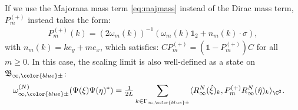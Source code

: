 \documentclass[a4paper, 11pt]{article}
\newcommand{\fB}{\mathfrak{B}}\newcommand{\cB}{\mathcal{B}}\newcommand{\dB}{\mathds{B}}\newcommand{\sB}{\mathscr{B}}
\DeclareMathOperator{\1}{\mathds{1}}
\begin{document}
If we use the Majorana mass term \eqref{eq:majmass} instead of the Dirac mass term, $P^{(+)}_{m}$ instead takes the form:
\begin{align}
\label{eq:majprojlim}
P^{(+)}_{m}(k) = (2\omega_{m}(k))^{-1}(\omega_{m}(k)\mathds{1}_{2} + n_{m}(k)\cdot\sigma),
\end{align}
with  $n_{m}(k) = k e_{y} + m e_{x}$, which satisfies: $CP^{(+)}_{m} = (\mathds{1}-P^{(+)}_{m})C$ for all $m\geq0$. In this case, the scaling limit is also well-defined as a state on $\fB_{\infty,{\color{blue}\pm}}$:
\begin{align}
\label{eq:scalinglimsdc}
\omega^{(N)}_{\infty,{\color{blue}\pm}}(\Psi(\xi)\Psi(\eta)^{*}) & = \tfrac{1}{2L}\sum_{k\in\Gamma_{\infty,{\color{blue}\pm}}}\langle R^{N}_{\infty}(\hat{\xi})_{k},P^{(+)}_{m} R^{N}_{\infty}(\hat{\eta})_{k}\rangle_{\C^{2}}.
\end{align}
\end{document}

